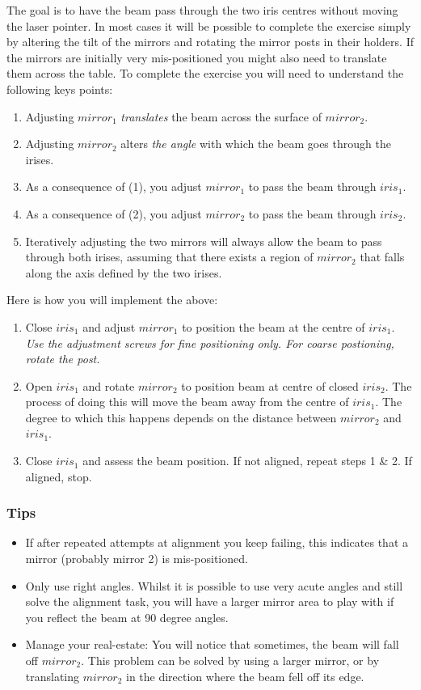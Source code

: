 \documentclass[a4paper]{report}
\begin{document}
The goal is to have the beam pass through the two iris centres without moving the laser pointer. 
In most cases it will be possible to complete the exercise simply by altering the tilt of the mirrors and rotating the mirror posts in their holders. 
If the mirrors are initially very mis-positioned you might also need to translate them across the table. 
To complete the exercise you will need to understand the following keys points:

\begin{enumerate}
\setlength\itemsep{0.1em}
\item Adjusting $mirror_1$ \textit{translates} the beam across the surface of $mirror_2$.
\item Adjusting $mirror_2$ alters \textit{the angle} with which the beam goes through the irises. 
\item As a consequence of (1), you adjust $mirror_1$ to pass the beam through $iris_1$.
\item As a consequence of (2), you adjust $mirror_2$ to pass the beam through $iris_2$.
\item Iteratively adjusting the two mirrors will always allow the beam to pass through both irises, assuming that there exists a region of $mirror_2$ that falls along the axis defined by the two irises. 
\end{enumerate}


Here is how you will implement the above:

\begin{enumerate}
\item Close $iris_1$ and adjust $mirror_1$ to position the beam at the centre of $iris_1$. \textit{Use the adjustment screws for fine positioning only. For coarse postioning, rotate the post.}
\item Open $iris_1$ and rotate $mirror_2$ to position beam at centre of closed $iris_2$. 
The process of doing this will move the beam away from the centre of $iris_1$. 
The degree to which this happens depends on the distance between $mirror_2$ and $iris_1$.
\item Close $iris_1$ and assess the beam position. If not aligned, repeat steps 1 \& 2. 
If aligned, stop. 
\end{enumerate}

\subsubsection{Tips}
\begin{itemize}
\item If after repeated attempts at alignment you keep failing, this indicates that a mirror (probably mirror 2) is mis-positioned. 
\item Only use right angles. 
Whilst it is possible to use very acute angles and still solve the alignment task, you will have a larger mirror area to play with if you reflect the beam at 90 degree angles.
\item Manage your real-estate: You will notice that sometimes, the beam will fall off $mirror_2$. This problem can be solved by using a larger mirror, or by translating $mirror_2$ in the direction where the beam fell off its edge.
\end{itemize}
\end{document}
